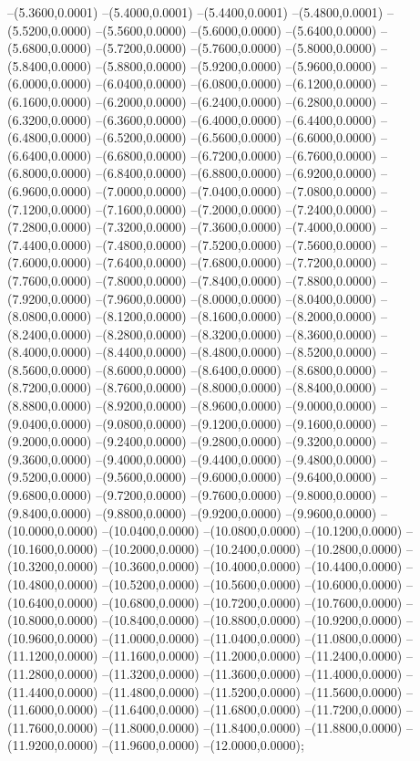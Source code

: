 {	--(5.3600,0.0001)
	--(5.4000,0.0001)
	--(5.4400,0.0001)
	--(5.4800,0.0001)
	--(5.5200,0.0000)
	--(5.5600,0.0000)
	--(5.6000,0.0000)
	--(5.6400,0.0000)
	--(5.6800,0.0000)
	--(5.7200,0.0000)
	--(5.7600,0.0000)
	--(5.8000,0.0000)
	--(5.8400,0.0000)
	--(5.8800,0.0000)
	--(5.9200,0.0000)
	--(5.9600,0.0000)
	--(6.0000,0.0000)
	--(6.0400,0.0000)
	--(6.0800,0.0000)
	--(6.1200,0.0000)
	--(6.1600,0.0000)
	--(6.2000,0.0000)
	--(6.2400,0.0000)
	--(6.2800,0.0000)
	--(6.3200,0.0000)
	--(6.3600,0.0000)
	--(6.4000,0.0000)
	--(6.4400,0.0000)
	--(6.4800,0.0000)
	--(6.5200,0.0000)
	--(6.5600,0.0000)
	--(6.6000,0.0000)
	--(6.6400,0.0000)
	--(6.6800,0.0000)
	--(6.7200,0.0000)
	--(6.7600,0.0000)
	--(6.8000,0.0000)
	--(6.8400,0.0000)
	--(6.8800,0.0000)
	--(6.9200,0.0000)
	--(6.9600,0.0000)
	--(7.0000,0.0000)
	--(7.0400,0.0000)
	--(7.0800,0.0000)
	--(7.1200,0.0000)
	--(7.1600,0.0000)
	--(7.2000,0.0000)
	--(7.2400,0.0000)
	--(7.2800,0.0000)
	--(7.3200,0.0000)
	--(7.3600,0.0000)
	--(7.4000,0.0000)
	--(7.4400,0.0000)
	--(7.4800,0.0000)
	--(7.5200,0.0000)
	--(7.5600,0.0000)
	--(7.6000,0.0000)
	--(7.6400,0.0000)
	--(7.6800,0.0000)
	--(7.7200,0.0000)
	--(7.7600,0.0000)
	--(7.8000,0.0000)
	--(7.8400,0.0000)
	--(7.8800,0.0000)
	--(7.9200,0.0000)
	--(7.9600,0.0000)
	--(8.0000,0.0000)
	--(8.0400,0.0000)
	--(8.0800,0.0000)
	--(8.1200,0.0000)
	--(8.1600,0.0000)
	--(8.2000,0.0000)
	--(8.2400,0.0000)
	--(8.2800,0.0000)
	--(8.3200,0.0000)
	--(8.3600,0.0000)
	--(8.4000,0.0000)
	--(8.4400,0.0000)
	--(8.4800,0.0000)
	--(8.5200,0.0000)
	--(8.5600,0.0000)
	--(8.6000,0.0000)
	--(8.6400,0.0000)
	--(8.6800,0.0000)
	--(8.7200,0.0000)
	--(8.7600,0.0000)
	--(8.8000,0.0000)
	--(8.8400,0.0000)
	--(8.8800,0.0000)
	--(8.9200,0.0000)
	--(8.9600,0.0000)
	--(9.0000,0.0000)
	--(9.0400,0.0000)
	--(9.0800,0.0000)
	--(9.1200,0.0000)
	--(9.1600,0.0000)
	--(9.2000,0.0000)
	--(9.2400,0.0000)
	--(9.2800,0.0000)
	--(9.3200,0.0000)
	--(9.3600,0.0000)
	--(9.4000,0.0000)
	--(9.4400,0.0000)
	--(9.4800,0.0000)
	--(9.5200,0.0000)
	--(9.5600,0.0000)
	--(9.6000,0.0000)
	--(9.6400,0.0000)
	--(9.6800,0.0000)
	--(9.7200,0.0000)
	--(9.7600,0.0000)
	--(9.8000,0.0000)
	--(9.8400,0.0000)
	--(9.8800,0.0000)
	--(9.9200,0.0000)
	--(9.9600,0.0000)
	--(10.0000,0.0000)
	--(10.0400,0.0000)
	--(10.0800,0.0000)
	--(10.1200,0.0000)
	--(10.1600,0.0000)
	--(10.2000,0.0000)
	--(10.2400,0.0000)
	--(10.2800,0.0000)
	--(10.3200,0.0000)
	--(10.3600,0.0000)
	--(10.4000,0.0000)
	--(10.4400,0.0000)
	--(10.4800,0.0000)
	--(10.5200,0.0000)
	--(10.5600,0.0000)
	--(10.6000,0.0000)
	--(10.6400,0.0000)
	--(10.6800,0.0000)
	--(10.7200,0.0000)
	--(10.7600,0.0000)
	--(10.8000,0.0000)
	--(10.8400,0.0000)
	--(10.8800,0.0000)
	--(10.9200,0.0000)
	--(10.9600,0.0000)
	--(11.0000,0.0000)
	--(11.0400,0.0000)
	--(11.0800,0.0000)
	--(11.1200,0.0000)
	--(11.1600,0.0000)
	--(11.2000,0.0000)
	--(11.2400,0.0000)
	--(11.2800,0.0000)
	--(11.3200,0.0000)
	--(11.3600,0.0000)
	--(11.4000,0.0000)
	--(11.4400,0.0000)
	--(11.4800,0.0000)
	--(11.5200,0.0000)
	--(11.5600,0.0000)
	--(11.6000,0.0000)
	--(11.6400,0.0000)
	--(11.6800,0.0000)
	--(11.7200,0.0000)
	--(11.7600,0.0000)
	--(11.8000,0.0000)
	--(11.8400,0.0000)
	--(11.8800,0.0000)
	--(11.9200,0.0000)
	--(11.9600,0.0000)
	--(12.0000,0.0000);
}
